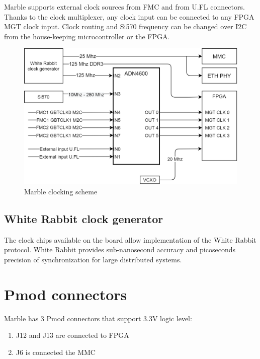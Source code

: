 \documentclass[12pt,oneside,a4]{article}
\begin{document}
Marble supports external clock sources from FMC and from U.FL connectors. Thanks to the clock multiplexer, any clock input can be connected to any FPGA MGT clock input. Clock routing and Si570 frequency can be changed over I2C from the house-keeping microcontroller or the FPGA.

\begin{figure}[H]
\begin{center}
\includegraphics[width=1\linewidth]{clocking.png}
 \caption{Marble clocking scheme}\label{clocking}
\end{center}
\end{figure}

\subsection{White Rabbit clock generator}
The clock chips available on the board allow implementation of the White Rabbit protocol. White Rabbit provides sub-nanosecond accuracy and picoseconds precision of synchronization for large distributed systems.

\section{Pmod connectors}
Marble has 3 Pmod connectors that support 3.3V logic level:
\begin{enumerate}
	\item J12 and J13 are connected to FPGA
	\item J6 is connected the MMC
\end{enumerate}
\end{document}
